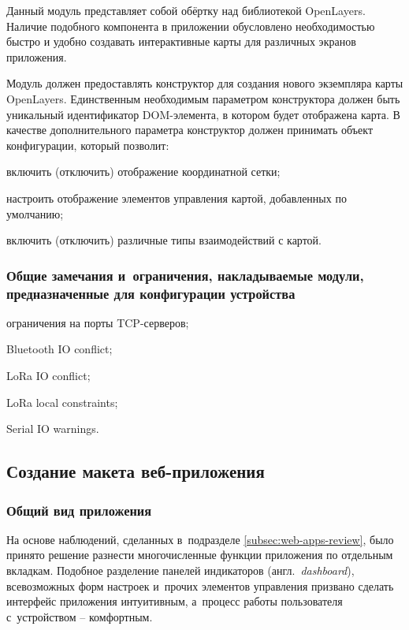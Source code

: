 Данный модуль представляет собой обёртку над библиотекой OpenLayers. Наличие подобного компонента в приложении обусловлено необходимостью быстро и удобно создавать интерактивные карты для различных экранов приложения.

Модуль должен предоставлять конструктор для создания нового экземпляра карты OpenLayers. Единственным необходимым параметром конструктора должен быть уникальный идентификатор DOM-элемента, в котором будет отображена карта. В качестве дополнительного параметра конструктор должен принимать объект конфигурации, который позволит:
\begin{dashitemize}
  \item включить (отключить) отображение координатной сетки;
  \item настроить отображение элементов управления картой, добавленных по умолчанию;
  \item включить (отключить) различные типы взаимодействий с картой.
\end{dashitemize}

\subsubsection{Общие замечания и~ограничения, накладываемые модули, предназначенные для конфигурации устройства}

\begin{dashitemize}
  \item ограничения на порты TCP-серверов;
  \item Bluetooth IO conflict;
  \item LoRa IO conflict;
  \item LoRa local constraints;
  \item Serial IO warnings.
\end{dashitemize}

\subsection{Создание макета веб-приложения}
\label{subsec:app-sketch}

\subsubsection{Общий вид приложения}
\label{subsec:app-sketch-general}

На основе наблюдений, сделанных в~подразделе \ref{subsec:web-apps-review}, было принято решение разнести многочисленные функции приложения по отдельным вкладкам. Подобное разделение панелей индикаторов (англ.~\emph{dashboard}), всевозможных форм настроек и~прочих элементов управления призвано сделать интерфейс приложения интуитивным, а~процесс работы пользователя с~устройством -- комфортным.


